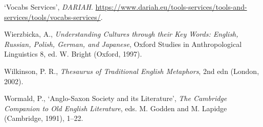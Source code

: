 \begin{list}{}
\item %
`Vocabs Services', \textit{DARIAH}. \url{https://www.dariah.eu/tools-services/tools-and-services/tools/vocabs-services/}.

\item %
Wierzbicka, A., \textit{Understanding Cultures through their Key Words: English, Russian, Polish, German, and Japanese}, Oxford Studies in Anthropological Linguistics 8, ed. W. Bright (Oxford, 1997).

\item %
Wilkinson, P. R., \textit{Thesaurus of Traditional English Metaphors}, 2nd edn (London, 2002). 



\item %
Wormald, P., `Anglo-Saxon Society and its Literature', \textit{The Cambridge Companion to Old English Literature}, eds. M. Godden and M. Lapidge (Cambridge, 1991), 1–22.

\end{list}